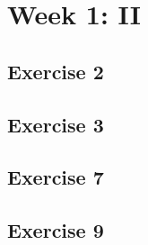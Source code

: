 



\section*{Week 1: II}

\subsection*{Exercise 2}




\newpage
\subsection*{Exercise 3}




\newpage
\subsection*{Exercise 7}







\newpage
\subsection*{Exercise 9}




